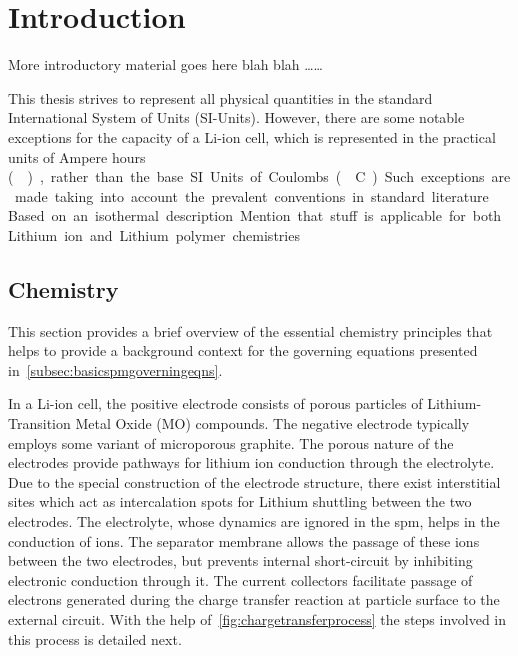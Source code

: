 
\clearpage
\chapter{Introduction}\label{ch:intro}

More introductory material goes here blah blah \dots \dots

This  thesis  strives to  represent  all  physical  quantities in  the  standard
International  System  of Units  (SI-Units).  However,  there are  some  notable
exceptions \eg{} for the capacity of a  Li-ion cell, which is represented in the
practical units of Ampere hours (\SI{}\amphours),  rather than the base SI Units
of Coulombs (\SI{}{\coulomb}). Such exceptions  are made taking into account the
prevalent conventions in standard literature.




Based on an isothermal description
Mention that stuff is applicable for both Lithium ion and Lithium polymer chemistries


\section{Chemistry}\label{subsec:liionchemistry}

This section  provides a  brief overview of  the essential  chemistry principles
that helps to provide a background context for the governing equations presented
in~\cref{subsec:basicspmgoverningeqns}.


In  a Li-ion  cell,  the  positive electrode  consists  of  porous particles  of
Lithium-Transition Metal Oxide (MO)  compounds. The negative electrode typically
employs  some  variant  of  microporous  graphite.  The  porous  nature  of  the
electrodes provide pathways for lithium  ion conduction through the electrolyte.
Due  to  the  special  construction  of the  electrode  structure,  there  exist
interstitial  sites  which act  as  intercalation  spots for  Lithium  shuttling
between the two  electrodes. The electrolyte, whose dynamics are  ignored in the
\gls{spm}, helps  in the  conduction of   ions. The  separator membrane
allows  the passage  of  these ions  between the  two  electrodes, but  prevents
internal  short-circuit  by inhibiting  electronic  conduction  through it.  The
current collectors facilitate  passage of electrons generated  during the charge
transfer reaction  at particle surface  to the  external circuit. With  the help
of~\cref{fig:chargetransferprocess}  the  steps  involved  in  this  process  is
detailed next.

